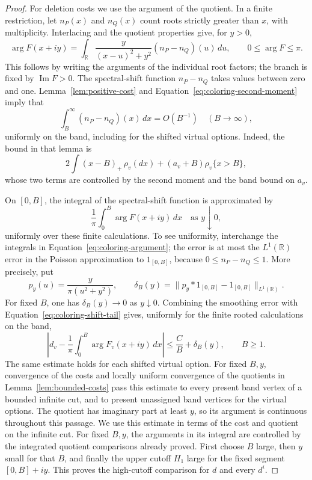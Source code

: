 \begin{proof}
For deletion costs we use the argument of the quotient.  In a finite
restriction, let $n_P(x)$ and $n_Q(x)$ count roots strictly greater than
$x$, with multiplicity.  Interlacing and the quotient properties give,
for $y>0$,
\begin{equation}
 \arg F(x+iy)
   =\int_{\mathbb R}\frac{y}{(x-u)^2+y^2}
                     (n_P-n_Q)(u)\,du,
 \qquad 0\leq\arg F\leq\pi.
 \label{eq:coloring-argument}
\end{equation}
This follows by writing the arguments of the individual root factors;
the branch is fixed by $\operatorname{Im}F>0$.  The spectral-shift function
$n_P-n_Q$ takes values between zero and one.  Lemma~\ref{lem:positive-cost}
and Equation~\eqref{eq:coloring-second-moment} imply that
\begin{equation}
 \int_B^\infty(n_P-n_Q)(x)\,dx=O(B^{-1})
 \quad(B\to\infty),
 \label{eq:coloring-shift-tail}
\end{equation}
uniformly on the band, including for the shifted virtual options.  Indeed,
the bound in that lemma is
\[
 2\int(x-B)_+\,\rho_v(dx)+(a_v+B)\rho_v\{x>B\},
\]
whose two terms are controlled by the second moment and the band bound on
$a_v$.

On $[0,B]$, the integral of the spectral-shift function is approximated by
\begin{equation}
 \frac1\pi\int_0^B\arg F(x+iy)\,dx
 \quad\text{as }y\downarrow0,
 \label{eq:coloring-shift-poisson}
\end{equation}
uniformly over these finite calculations.  To see uniformity, interchange
the integrals in Equation~\eqref{eq:coloring-argument}; the error is at most
the $L^1(\mathbb R)$ error in the Poisson approximation to $1_{[0,B]}$,
because $0\leq n_P-n_Q\leq1$. More precisely, put
\[
 p_y(u)=\frac{y}{\pi(u^2+y^2)},\qquad
 \delta_B(y)=\|p_y*1_{[0,B]}-1_{[0,B]}\|_{L^1(\mathbb R)}.
\]
For fixed $B$, one has $\delta_B(y)\to0$ as $y\downarrow0$. Combining
the smoothing error with Equation~\eqref{eq:coloring-shift-tail} gives,
uniformly for the finite rooted calculations on the band,
\begin{equation}\label{eq:coloring-cut-cost-recovery}
 \left|d_v-\frac1\pi\int_0^B\arg F_v(x+iy)\,dx\right|
 \leq\frac{C}{B}+\delta_B(y),\qquad B\geq1.
\end{equation}
The same estimate holds for each shifted virtual option. For fixed $B,y$,
convergence of the costs and locally uniform convergence of the quotients
in Lemma~\ref{lem:bounded-costs} pass this estimate to every present band
vertex of a bounded infinite cut, and to present unassigned band vertices for
the virtual options. The quotient has imaginary part at least $y$, so its argument
is continuous throughout this passage. We use this estimate in terms of
the cost and quotient on the infinite cut. For fixed $B,y$, the arguments in its
integral are controlled by the integrated quotient comparisons already
proved. First choose $B$ large, then $y$ small for that $B$, and finally
the upper cutoff $H_1$ large for the fixed segment $[0,B]+iy$. This proves
the high-cutoff comparison for $d$ and every $d^i$.


\end{proof}
